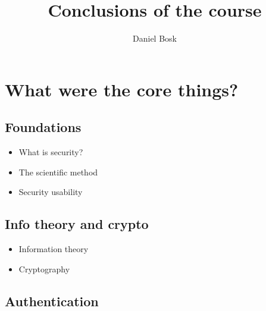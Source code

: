 \title{%
  Conclusions of the course
}
\author{Daniel Bosk}


\mode*

\begin{abstract}
  
\end{abstract}


\section{What were the core things?}

\subsection{Foundations}

\begin{frame}
  \begin{itemize}
    \item What is security?
    \item The scientific method
    \item Security usability
  \end{itemize}
\end{frame}

\subsection{Info theory and crypto}

\begin{frame}
  \begin{itemize}
    \item Information theory
    \item Cryptography
  \end{itemize}
\end{frame}

\subsection{Authentication}

